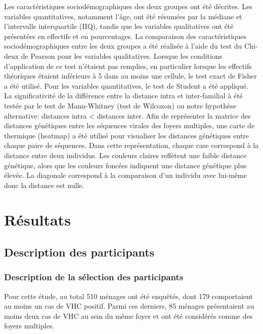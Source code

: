 \documentclass[a4paper,12pt]{article}
\begin{document}
Les caractéristiques sociodémographiques des deux groupes ont été décrites. Les variables quantitatives, notamment l’âge, ont été résumées par la médiane et l’intervalle interquartile (IIQ), tandis que les variables qualitatives ont été présentées en effectifs et en pourcentages. La comparaison des caractéristiques sociodémographiques entre les deux groupes a été réalisée à l’aide du test du Chi-deux de Pearson pour les variables qualitatives. Lorsque les conditions d’application de ce test n’étaient pas remplies, en particulier lorsque les effectifs théoriques étaient inférieurs à 5 dans au moins une cellule, le test exact de Fisher a été utilisé. Pour les variables quantitatives, le test de Student a été appliqué.\\


La significativité de la différence entre la distance intra et inter-familial à été testée par le test de Mann-Whitney (test de Wilcoxon) ou notre hypothèse alternative: distances intra < distances inter.  Afin de représenter la matrice des distances génétiques entre les séquences virales des foyers multiples, une carte de thermique (heatmap) a été utilisé pour visualiser les distances génétiques entre chaque paire de séquences. Dans cette représentation, chaque case correspond à la distance entre deux individus. Les couleurs claires reflètent une faible distance génétique, alors que les couleurs foncées indiquent une distance génétique plus élevée. La diagonale correspond à la comparaison d'un individu avec lui-même donc la distance est nulle. 


\newpage 
\section{Résultats }

\subsection{Description des participants}


\subsubsection{Description de la sélection des participants}

Pour cette étude, au total 510 ménages ont été enquêtés, dont 179 comportaient au moins un cas de VHC positif. Parmi ces derniers, 85 ménages présentaient au moins deux cas de VHC au sein du même foyer et ont été considérés comme des foyers multiples. \\
\end{document}
